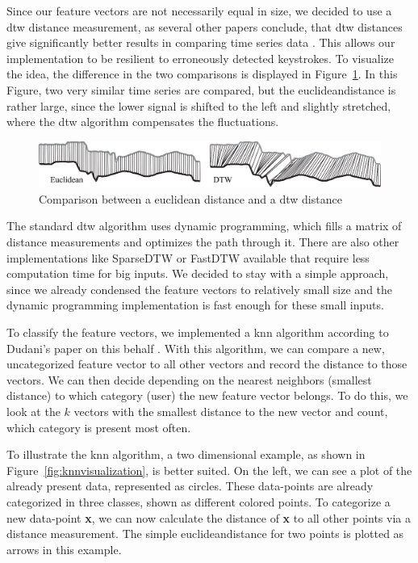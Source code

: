 Since our feature vectors are not necessarily equal in size, we decided to use a \gls{dtw} distance measurement, as several other papers conclude, that \gls{dtw} distances give significantly better results in comparing time series data \cite{ding2008querying}. This allows our implementation to be resilient to erroneously detected keystrokes. To visualize the idea, the difference in the two comparisons is displayed in Figure~\ref{fig:euclideandtw}. In this Figure, two very similar time series are compared, but the \gls{euclideandistance} is rather large, since the lower signal is shifted to the left and slightly stretched, where the \gls{dtw} algorithm compensates the fluctuations.

\begin{figure}
    \centering
    \includegraphics[width=\textwidth]{figures/EuclideanvsDTW.png}
    \caption{Comparison between a euclidean distance and a \gls{dtw} distance \cite{keogh2005exact}}
    \label{fig:euclideandtw}
\end{figure}

The standard \gls{dtw} algorithm uses dynamic programming, which fills a matrix of distance measurements and optimizes the path through it. There are also other implementations like SparseDTW or FastDTW available that require less computation time for big inputs. We decided to stay with a simple approach, since we already condensed the feature vectors to relatively small size and the dynamic programming implementation is fast enough for these small inputs.

To classify the feature vectors, we implemented a \gls{knn} algorithm according to Dudani's paper on this behalf \cite{dudani1976distance}. With this algorithm, we can compare a new, uncategorized feature vector to all other vectors and record the distance to those vectors. We can then decide depending on the nearest neighbors (\ie smallest distance) to which category (\ie user) the new feature vector belongs. To do this, we look at the $k$ vectors with the smallest distance to the new vector and count, which category is present most often.

To illustrate the \gls{knn} algorithm, a two dimensional example, as shown in Figure~\ref{fig:knnvisualization}, is better suited. On the left, we can see a plot of the already present data, represented as circles. These data-points are already categorized in three classes, shown as different colored points. To categorize a new data-point \textbf{x}, we can now calculate the distance of \textbf{x} to all other points via a distance measurement. The simple \gls{euclideandistance} for two points is plotted as arrows in this example.

